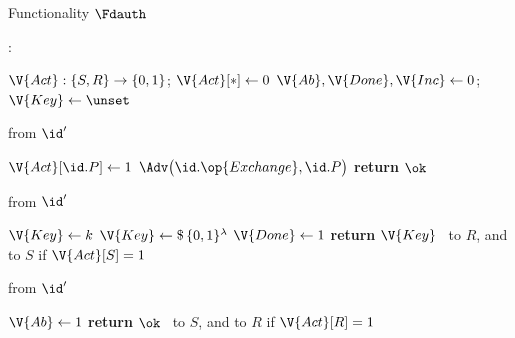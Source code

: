 \begin{interface}[nofloat]{Functionality $\Fdauth$ \\
}

{\scriptsize
\setlength{\columnsep}{1.4em}
\begin{multicols}{2}
:
\begin{algorithmic}[1]
\setcounter{contline}{0}\algcont
\State $\V{Act} : \{S, R\} \to \{0,1\}$; \quad $\V{Act}[*] \gets 0$
\State $\V{Ab}, \V{Done}, \V{Inc} \gets 0$; \quad $\V{Key} \gets \unset$
\algsave
\end{algorithmic}
\vspace{1.4ex}

 \quad from $\id'$
\begin{algorithmic}[1]
\algcont
{}
   \label{ln:dauthorder}
\EndIf
\State $\V{Act}[\id.P] \gets 1$
\State $\Adv\bigl(\id.\op{Exchange}, \id.P\bigr)$ \label{ln:dauthnotify}
\State \textbf{return} $\ok$
\algsave
\end{algorithmic}
\vspace{1.4ex}

 \quad from $\id'$
\begin{algorithmic}[1]
\algcont
{}
  \State $\V{Key} \gets k$ \label{ln:dauthcorr}
\EndIf
{}
  \State $\V{Key} \gets \$\,\{0,1\}^{\lambda}$ \label{ln:dauthfresh}
\EndIf
\State $\V{Done} \gets 1$
\State \textbf{return} $\V{Key}$ \ to $R$, and to $S$ if $\V{Act}[S] = 1$
\algsave
\end{algorithmic}
\vspace{1.4ex}

\columnbreak

 \quad from $\id'$
\begin{algorithmic}[1]
\algcont
{}
\State $\V{Ab} \gets 1$ \label{ln:dauthabort}
\State \textbf{return} $\ok$ \ to $S$, and to $R$ if $\V{Act}[R] = 1$
\algsave
\end{algorithmic}
\vspace{1.4ex}


\end{multicols}}
\end{interface}
